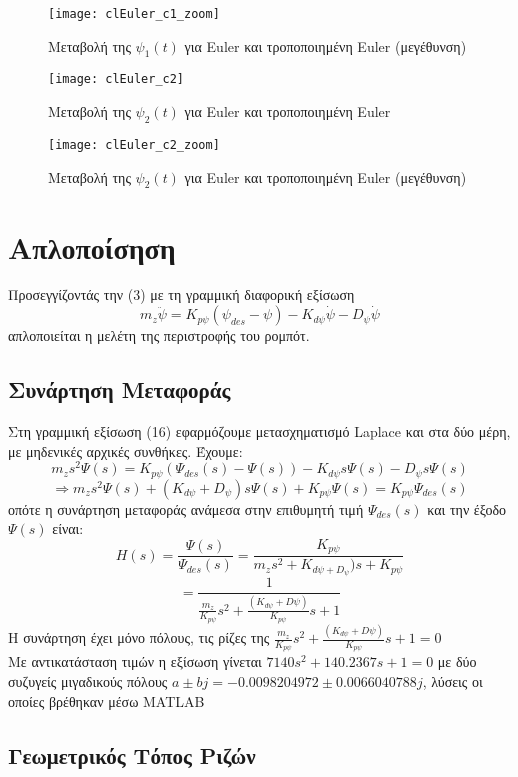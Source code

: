 \documentclass{article}
\begin{document}
\begin{figure}[h!]
 \centering
\texttt{[image: clEuler\_c1\_zoom]}
\caption{Μεταβολή της $\psi_1(t)$ για Euler και τροποποιημένη Euler (μεγέθυνση)}
\end{figure}
\clearpage

\begin{figure}[bh!]
 \centering
\texttt{[image: clEuler\_c2]}
\caption{Μεταβολή της $\psi_2(t)$ για Euler και τροποποιημένη
 Euler}
\end{figure}

\begin{figure}[h!]
 \centering
\texttt{[image: clEuler\_c2\_zoom]}
\caption{Μεταβολή της $\psi_2(t)$ για Euler και τροποποιημένη Euler (μεγέθυνση)}
\end{figure}
\clearpage

\section{Απλοποίσηση}
Προσεγγίζοντάς την (3) με τη γραμμική διαφορική εξίσωση 
\begin{equation}
m_z\ddot{\psi} = K_{p\psi}(\psi_{des} - \psi) - K_{d\psi}\dot{\psi} - D_\psi\dot{\psi}
\end{equation}
απλοποιείται η μελέτη της περιστροφής του ρομπότ.
\subsection{Συνάρτηση Μεταφοράς}
Στη γραμμική εξίσωση (16) εφαρμόζουμε μετασχηματισμό Laplace και στα δύο μέρη, με μηδενικές αρχικές συνθήκες. Έχουμε:
\[m_zs^2Ψ(s) = K_{p\psi}(Ψ_{des}(s) - Ψ(s)) - K_{d\psi}sΨ(s) - D_\psi s Ψ(s)\]
\[\Rightarrow m_zs^2Ψ(s) + (K_{d\psi} + D_\psi)sΨ(s) + K_{p\psi}Ψ(s) = K_{p\psi}Ψ_{des}(s)\]
οπότε η συνάρτηση μεταφοράς ανάμεσα στην επιθυμητή τιμή \(Ψ_{des}(s)\) και την έξοδο \(Ψ(s)\) είναι:
\[H(s) = \frac{Ψ(s)}{Ψ_{des}(s)} = \frac{K_{p\psi}}{m_zs^2 + K_{d\psi + D_\psi})s + K_{p\psi}}\]
\[= \frac{1}{\frac{m_z}{K_{p\psi}}s^2 + \frac{(K_{d\psi} + D\psi)}{K_{p\psi}}s +1}\]
Η συνάρτηση έχει μόνο πόλους, τις ρίζες της \(\frac{m_z}{K_{p\psi}}s^2 + \frac{(K_{d\psi} + D\psi)}{K_{p\psi}}s +1 = 0\)
\\Με αντικατάσταση τιμών η εξίσωση γίνεται \(7140s^2 + 140.2367s + 1 = 0\) με δύο συζυγείς μιγαδικούς πόλους \(a\pm bj = -0.0098204972 \pm 0.0066040788j\), λύσεις οι οποίες βρέθηκαν μέσω MATLAB
\subsection{Γεωμετρικός Τόπος Ριζών}
\end{document}
